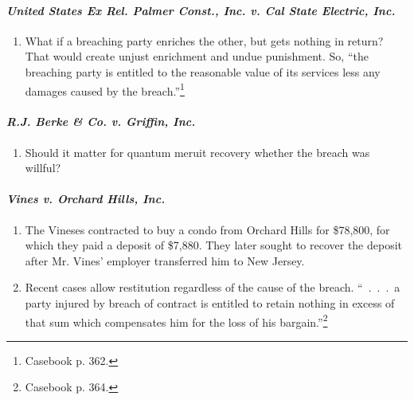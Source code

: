 \paragraph{\emph{United States Ex Rel. Palmer Const., Inc. v. Cal State 
Electric, Inc.}}

\begin{enumerate}
    \item What if a breaching party enriches the other, but gets nothing in 
    return? That would create unjust enrichment and undue punishment. So, 
    ``the breaching party is entitled to the reasonable value of its services 
    less any damages caused by the breach.''\footnote{Casebook p. 362.}
\end{enumerate}

\paragraph{\emph{R.J. Berke \& Co. v. Griffin, Inc.}}

\begin{enumerate}
    \item Should it matter for quantum meruit recovery whether the breach was 
    willful?
\end{enumerate}

\paragraph{\emph{Vines v. Orchard Hills, Inc.}}

\begin{enumerate}
    \item The Vineses contracted to buy a condo from Orchard Hills for \$78,800, 
    for which they paid a deposit of \$7,880. They later sought to recover the 
    deposit after Mr. Vines' employer transferred him to New Jersey.
    \item Recent cases allow restitution regardless of the cause of the 
    breach. ``~.~.~.~a party injured by breach of contract is entitled to 
    retain nothing in excess of that sum which compensates him for the loss of 
    his bargain.''\footnote{Casebook p. 364.}
\end{enumerate}
